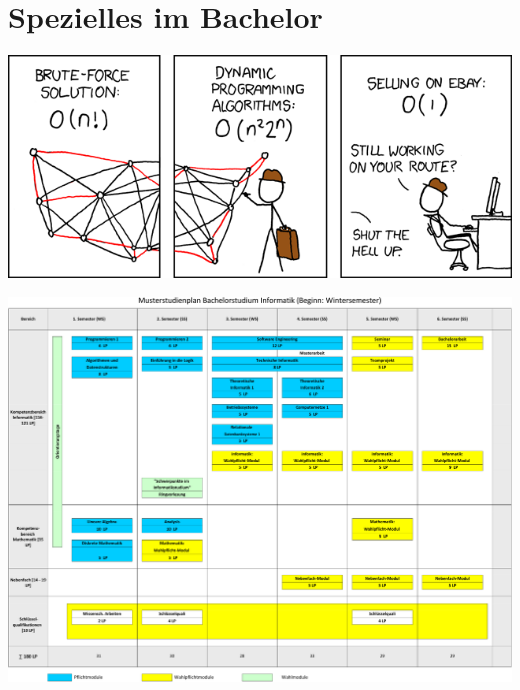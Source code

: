 \documentclass[]{papertex}
\begin{document}
	\section{Spezielles im Bachelor}
		\label{bachelor}
		\newpage
		\begin{multicols}{2}
		\end{multicols}
		\begin{center}
		\includegraphics[totalheight=6cm]{bilder/XKCD/travelling_salesman}
		\end{center}
		\begin{minipage}{1.0\linewidth}
			\begin{center}     
			\label{musterstudienplan}
			\includegraphics[angle=90, totalheight=\textheight, width=\textwidth ]{bilder/studienplan_bsc_ws/muster_erste_ws-crop}
			\end{center}  
		\end{minipage}
\end{document}
